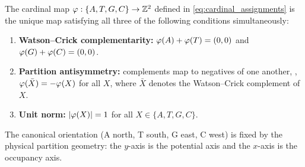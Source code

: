 \begin{theorem}
\label{thm:cardinal_unique}
The cardinal map $\varphi: \{A,T,G,C\} \to \mathbb{Z}^2$ defined in
\eqref{eq:cardinal_assignments} is the unique map satisfying all three of
the following conditions simultaneously:
\begin{enumerate}[label=(\roman*)]
  \item \textbf{Watson--Crick complementarity:}
    $\varphi(A) + \varphi(T) = (0,0)$ and
    $\varphi(G) + \varphi(C) = (0,0)$.
  \item \textbf{Partition antisymmetry:} complements map to negatives of
    one another, \ie, $\varphi(\bar{X}) = -\varphi(X)$ for all $X$,
    where $\bar{X}$ denotes the Watson--Crick complement of $X$.
  \item \textbf{Unit norm:} $|\varphi(X)| = 1$ for all
    $X \in \{A,T,G,C\}$.
\end{enumerate}
The canonical orientation (A north, T south, G east, C west) is fixed
by the physical partition geometry: the $y$-axis is the potential axis
and the $x$-axis is the occupancy axis.
\end{theorem}

